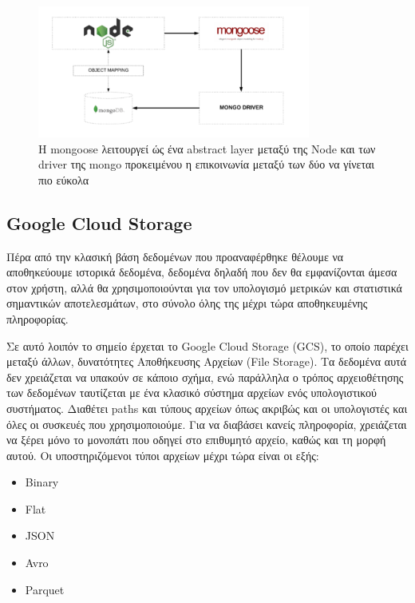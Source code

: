 \begin{figure}[!ht]
	\centering
	\includegraphics[width=0.8\textwidth]{./images/chapter2/mongoose.png}
	\caption[Mongoose, ένα abstract layer μεταξύ Node και mongo]
	{H mongoose λειτουργεί ώς ένα abstract layer μεταξύ της Node και των driver της mongo προκειμένου η επικοινωνία μεταξύ των δύο να γίνεται πιο εύκολα}
	\label{fig:mongoose}
\end{figure}

\break

\subsection{Google Cloud Storage}
\label{subsec:gcloud}

Πέρα από την κλασική βάση δεδομένων που προαναφέρθηκε θέλουμε να αποθηκεύουμε ιστορικά δεδομένα,
δεδομένα δηλαδή που δεν θα εμφανίζονται άμεσα στον χρήστη, αλλά θα χρησιμοποιούνται για τον υπολογισμό μετρικών και στατιστικά σημαντικών αποτελεσμάτων,
στο σύνολο όλης της μέχρι τώρα αποθηκευμένης πληροφορίας.

Σε αυτό λοιπόν το σημείο έρχεται το Google Cloud Storage (GCS), το οποίο παρέχει μεταξύ άλλων, δυνατότητες
Αποθήκευσης Αρχείων (File Storage). Τα δεδομένα αυτά δεν χρειάζεται να υπακούν σε κάποιο σχήμα,
ενώ παράλληλα ο τρόπος αρχειοθέτησης των δεδομένων ταυτίζεται με ένα κλασικό σύστημα αρχείων
ενός υπολογιστικού συστήματος. Διαθέτει paths και τύπους αρχείων όπως ακριβώς και οι υπολογιστές και όλες οι
συσκευές που χρησιμοποιούμε. Για να διαβάσει κανείς πληροφορία, χρειάζεται να ξέρει μόνο το μονοπάτι που οδηγεί
στο επιθυμητό αρχείο, καθώς και τη μορφή αυτού. Οι υποστηριζόμενοι τύποι αρχείων μέχρι τώρα είναι οι εξής:

\begin{itemize}
	\item Binary
	\item Flat
	\item JSON
	\item Avro
	\item Parquet
\end{itemize}

